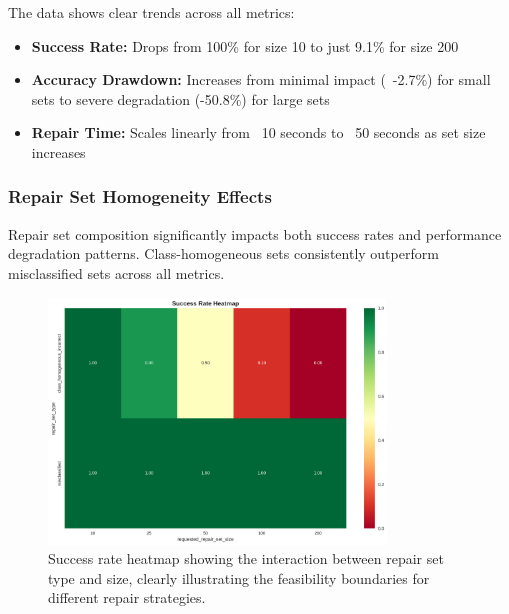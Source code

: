 \documentclass{article}
\begin{document}
The data shows clear trends across all metrics:
\begin{itemize}
	\item \textbf{Success Rate:} Drops from 100\% for size 10 to just 9.1\% for size 200
	\item \textbf{Accuracy Drawdown:} Increases from minimal impact (~-2.7\%) for small sets to severe degradation (-50.8\%) for large sets
	\item \textbf{Repair Time:} Scales linearly from ~10 seconds to ~50 seconds as set size increases
\end{itemize}

\subsubsection{Repair Set Homogeneity Effects}

Repair set composition significantly impacts both success rates and performance degradation patterns. Class-homogeneous sets consistently outperform misclassified sets across all metrics.

\begin{figure}[h]
	\centering
	\includegraphics[width=0.8\textwidth]{results/one_shot_analysis/success_rates/success_rate_heatmap.png}
	\caption{Success rate heatmap showing the interaction between repair set type and size, clearly illustrating the feasibility boundaries for different repair strategies.}
	\label{fig:success_rate_heatmap}
\end{figure}
\end{document}
